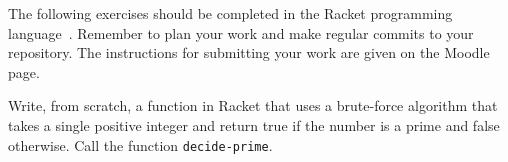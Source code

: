 \documentclass[a4paper, 12pt]{exam}
\begin{document}
\noindent
The following exercises should be completed in the Racket programming language~\cite{racketwebsite}.
Remember to plan your work and make regular commits to your repository.
The instructions for submitting your work are given on the Moodle page.

\begin{questions}

\question
Write, from scratch, a function in Racket that uses a brute-force algorithm that takes a single positive integer and return true if the number is a prime and false otherwise. Call the function \texttt{decide-prime}.


\end{questions}



\end{document}
